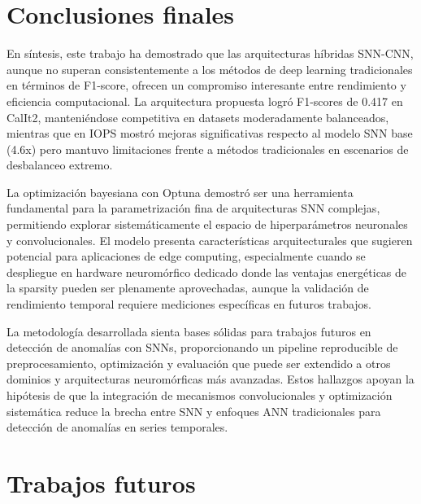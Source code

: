 \section{Conclusiones finales}
En síntesis, este trabajo ha demostrado que las arquitecturas híbridas SNN-CNN, aunque no superan consistentemente a los métodos de deep learning tradicionales en términos de F1-score, ofrecen un compromiso interesante entre rendimiento y eficiencia computacional. La arquitectura propuesta logró F1-scores de 0.417 en CalIt2, manteniéndose competitiva en datasets moderadamente balanceados, mientras que en IOPS mostró mejoras significativas respecto al modelo SNN base (4.6x) pero mantuvo limitaciones frente a métodos tradicionales en escenarios de desbalanceo extremo.

La optimización bayesiana con Optuna demostró ser una herramienta fundamental para la parametrización fina de arquitecturas SNN complejas, permitiendo explorar sistemáticamente el espacio de hiperparámetros neuronales y convolucionales. El modelo presenta características arquitecturales que sugieren potencial para aplicaciones de edge computing, especialmente cuando se despliegue en hardware neuromórfico dedicado donde las ventajas energéticas de la sparsity pueden ser plenamente aprovechadas, aunque la validación de rendimiento temporal requiere mediciones específicas en futuros trabajos.

La metodología desarrollada sienta bases sólidas para trabajos futuros en detección de anomalías con SNNs, proporcionando un pipeline reproducible de preprocesamiento, optimización y evaluación que puede ser extendido a otros dominios y arquitecturas neuromórficas más avanzadas.
Estos hallazgos apoyan la hipótesis de que la integración de mecanismos convolucionales y optimización sistemática reduce la brecha entre SNN y enfoques ANN tradicionales para detección de anomalías en series temporales.

\section{Trabajos futuros}

